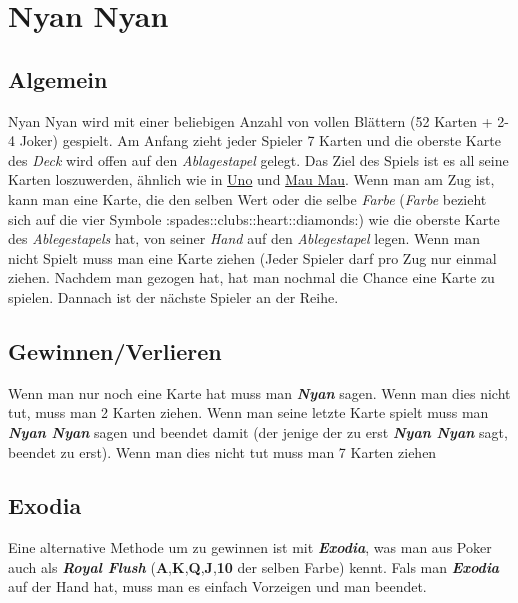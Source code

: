 \documentclass[10pt,a4paper]{article}
\date{}
\begin{document}
\section{Nyan Nyan}\label{nyan-nyan}

\subsection{Algemein}\label{algemein}

Nyan Nyan wird mit einer beliebigen Anzahl von vollen Blättern (52
Karten + 2-4 Joker) gespielt. Am Anfang zieht jeder Spieler 7 Karten und
die oberste Karte des \emph{Deck} wird offen auf den \emph{Ablagestapel}
gelegt. Das Ziel des Spiels ist es all seine Karten loszuwerden, ähnlich
wie in \href{https://de.wikipedia.org/wiki/Uno_(Kartenspiel)}{Uno} und
\href{https://de.wikipedia.org/wiki/Mau-Mau_(Kartenspiel)}{Mau Mau}.
Wenn man am Zug ist, kann man eine Karte, die den selben Wert oder die
selbe \emph{Farbe} (\emph{Farbe} bezieht sich auf die vier Symbole
:spades::clubs::heart::diamonds:) wie die oberste Karte des
\emph{Ablegestapels} hat, von seiner \emph{Hand} auf den
\emph{Ablegestapel} legen. Wenn man nicht Spielt muss man eine Karte
ziehen (Jeder Spieler darf pro Zug nur einmal ziehen. Nachdem man
gezogen hat, hat man nochmal die Chance eine Karte zu spielen. Dannach
ist der nächste Spieler an der Reihe.

\subsection{Gewinnen/Verlieren}\label{gewinnenverlieren}

Wenn man nur noch eine Karte hat muss man \textbf{\emph{Nyan}} sagen.
Wenn man dies nicht tut, muss man 2 Karten ziehen. Wenn man seine letzte
Karte spielt muss man \textbf{\emph{Nyan Nyan}} sagen und beendet damit
(der jenige der zu erst \textbf{\emph{Nyan Nyan}} sagt, beendet zu
erst). Wenn man dies nicht tut muss man 7 Karten ziehen

\subsection{Exodia}\label{exodia}

Eine alternative Methode um zu gewinnen ist mit \textbf{\emph{Exodia}},
was man aus Poker auch als \textbf{\emph{Royal Flush}}
(\textbf{A},\textbf{K},\textbf{Q},\textbf{J},\textbf{10} der selben
Farbe) kennt. Fals man \textbf{\emph{Exodia}} auf der Hand hat, muss man
es einfach Vorzeigen und man beendet.
\end{document}
